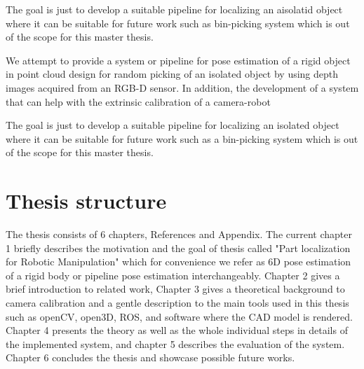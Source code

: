 The goal is just to develop a suitable pipeline for localizing an aisolatid object where it can be suitable for future work such as bin-picking system which is out of the scope for this master thesis.
\fi

We attempt to provide a system or pipeline for pose estimation of a rigid object in point cloud design for random picking of an isolated object by using depth images acquired from an RGB-D sensor. In addition, the development of a system that can help with the extrinsic calibration of a camera-robot

The goal is just to develop a suitable pipeline for localizing an isolated object where it can be suitable for future work such as a bin-picking system which is out of the scope for this master thesis.


\section{Thesis structure}
The thesis consists of 6 chapters, References and Appendix. The current chapter 1 briefly describes the motivation and the goal of thesis called "Part localization for Robotic Manipulation" which for convenience we refer as 6D pose estimation of a rigid body or pipeline pose estimation interchangeably. Chapter 2 gives a brief introduction to related work, Chapter 3 gives a theoretical background to camera calibration and a gentle description to the main tools used in this thesis such as openCV, open3D, ROS, and software where the CAD model is rendered. Chapter 4 presents the theory as well as the whole individual steps in details of the implemented system, and chapter 5 describes the evaluation of the system. Chapter 6 concludes the thesis and showcase possible future works.

